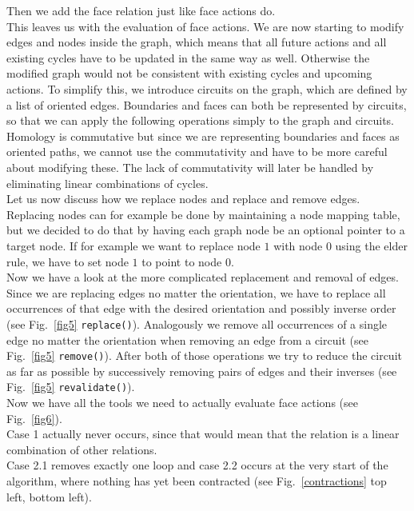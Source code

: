 \documentclass[11pt, a4paper, UKenglish]{article}
\begin{document}
    Then we add the face relation just like face actions do.\\
    This leaves us with the evaluation of face actions.
    We are now starting to modify edges and nodes inside the graph, which means that all future actions and all existing cycles have to be updated in the same way as well.
    Otherwise the modified graph would not be consistent with existing cycles and upcoming actions.
    To simplify this, we introduce circuits on the graph, which are defined by a list of oriented edges.
    Boundaries and faces can both be represented by circuits, so that we can apply the following operations simply to the graph and circuits.
    Homology is commutative but since we are representing boundaries and faces as oriented paths, we cannot use the commutativity and have to be more careful about modifying these.
    The lack of commutativity will later be handled by eliminating linear combinations of cycles.\\
    Let us now discuss how we replace nodes and replace and remove edges.
    Replacing nodes can for example be done by maintaining a node mapping table, but we decided to do that by having each graph node be an optional pointer to a target node.
    If for example we want to replace node $1$ with node $0$ using the elder rule, we have to set node $1$ to point to node $0$.\\
    Now we have a look at the more complicated replacement and removal of edges.
    Since we are replacing edges no matter the orientation, we have to replace all occurrences of that edge with the desired orientation and possibly inverse order (see Fig.\ \ref{fig5} \texttt{replace()}).
    Analogously we remove all occurrences of a single edge no matter the orientation when removing an edge from a circuit (see Fig.\ \ref{fig5} \texttt{remove()}).
    After both of those operations we try to reduce the circuit as far as possible by successively removing pairs of edges and their inverses (see Fig.\ \ref{fig5} \texttt{revalidate()}).\\
    
    Now we have all the tools we need to actually evaluate face actions (see Fig.\ \ref{fig6}).\\
    Case 1 actually never occurs, since that would mean that the relation is a linear combination of other relations.\\
    Case 2.1 removes exactly one loop and case 2.2 occurs at the very start of the algorithm, where nothing has yet been contracted (see Fig.\ \ref{contractions} top left, bottom left).\\
\end{document}
